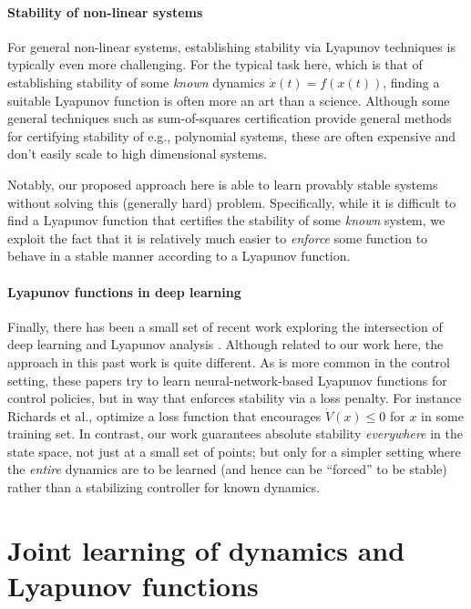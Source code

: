 \paragraph{Stability of non-linear systems}  For general non-linear systems, establishing stability via Lyapunov techniques is typically even more challenging.  For the typical task here, which is that of establishing stability of some \emph{known} dynamics $\dot{x}(t) = f(x(t))$, finding a suitable Lyapunov function is often more an art than a science.  Although some general techniques such as sum-of-squares certification \citep{parrilo2000structured,papachristodoulou2002construction} provide general methods for certifying stability of e.g., polynomial systems, these are often expensive and don't easily scale to high dimensional systems.

Notably, our proposed approach here is able to learn provably stable systems without solving this (generally hard) problem.  Specifically, while it is difficult to find a Lyapunov function that certifies the stability of some \emph{known} system, we exploit the fact that it is relatively much easier to \emph{enforce} some function to behave in a stable manner according to a Lyapunov function.

\paragraph{Lyapunov functions in deep learning}
Finally, there has been a small set of recent work exploring the intersection of deep learning and Lyapunov analysis \citep{chow2018lyapunov,richards2018lyapunov,taylor2019episodic}.  Although related to our work here, the approach in this past work is quite different.  As is more common in the control setting, these papers try to learn neural-network-based Lyapunov functions for control policies, but in way that enforces stability via a loss penalty.  For instance Richards et al., \citep{richards2018lyapunov} optimize a loss function that encourages $\dot{V}(x) \leq 0$ for $x$ in some training set.  In contrast, our work guarantees absolute stability \emph{everywhere} in the state space, not just at a small set of points; but only for a simpler setting where the \emph{entire} dynamics are to be learned (and hence can be ``forced'' to be stable) rather than a stabilizing controller for known dynamics.

\section{Joint learning of dynamics and Lyapunov functions}

